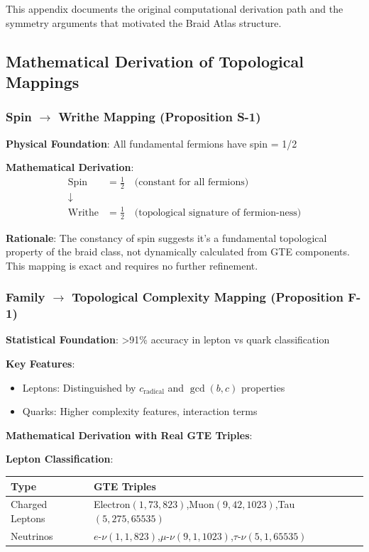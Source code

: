\documentclass[11pt]{article}
\theoremstyle{remark}
\begin{document}
\vspace{0.5em}
This appendix documents the original computational derivation path and the symmetry arguments that motivated the Braid Atlas structure.

\subsection{Mathematical Derivation of Topological Mappings}

\subsubsection{Spin $\rightarrow$ Writhe Mapping (Proposition S-1)}

\textbf{Physical Foundation}: All fundamental fermions have spin = 1/2

\textbf{Mathematical Derivation}:
\begin{align}
\text{Spin} &= \frac{1}{2} \quad \text{(constant for all fermions)} \\
\downarrow \\
\text{Writhe} &= \frac{1}{2} \quad \text{(topological signature of fermion-ness)}
\end{align}

\textbf{Rationale}: The constancy of spin suggests it's a fundamental topological property of the braid class, not dynamically calculated from GTE components. This mapping is exact and requires no further refinement.

\subsubsection{Family $\rightarrow$ Topological Complexity Mapping (Proposition F-1)}

\textbf{Statistical Foundation}: >91\% accuracy in lepton vs quark classification

\textbf{Key Features}:
\begin{itemize}
    \item Leptons: Distinguished by $c_{\text{radical}}$ and $\gcd(b,c)$ properties
    \item Quarks: Higher complexity features, interaction terms
\end{itemize}

\textbf{Mathematical Derivation with Real GTE Triples}:

\textbf{Lepton Classification}:
\begin{table}[H]
\centering
\renewcommand{\arraystretch}{1.3}
\begin{tabularx}{\textwidth}{@{}l X@{}}
\toprule
\textbf{Type} & \textbf{GTE Triples} \\
\midrule
Charged Leptons & Electron$(1,73,823)$,\quad Muon$(9,42,1023)$,\quad Tau$(5,275,65535)$ \\
Neutrinos & $e$-$\nu(1,1,823)$,\quad $\mu$-$\nu(9,1,1023)$,\quad $\tau$-$\nu(5,1,65535)$ \\
\bottomrule
\end{tabularx}
\end{table}
\end{document}
